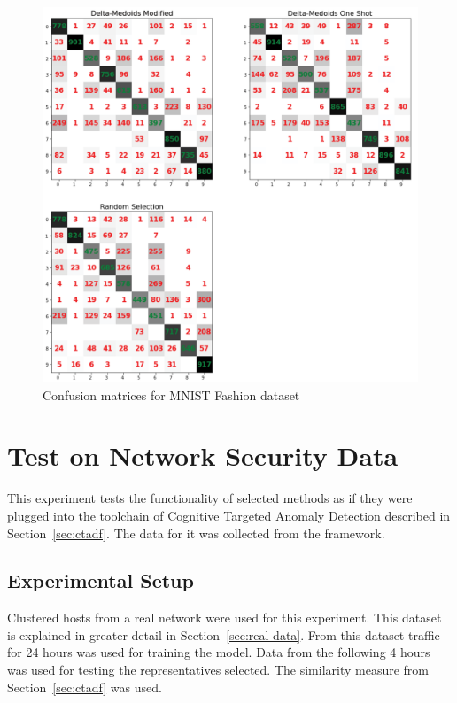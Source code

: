 \documentclass[thesis=B,english]{FITthesis}[2012/10/20]
\begin{document}
\medskip

\begin{figure}[t]
   \includegraphics[width=\linewidth]{img/exp3_mnist_fashion.png}
  \caption{Confusion matrices for MNIST Fashion dataset}
  \label{img:exp4}
\end{figure}

\section{Test on Network Security Data}\label{sec:exp4}

This experiment tests the functionality of selected methods as if they were plugged into the toolchain of Cognitive Targeted Anomaly Detection described in Section~\ref{sec:ctadf}.
The data for it was collected from the framework.

\subsection{Experimental Setup}
Clustered hosts from a real network were used for this experiment.
This dataset is explained in greater detail in Section~\ref{sec:real-data}.
From this dataset traffic for 24 hours was used for training the model.
Data from the following 4 hours was used for testing the representatives selected.
The similarity measure from Section~\ref{sec:ctadf} was used.
\end{document}
